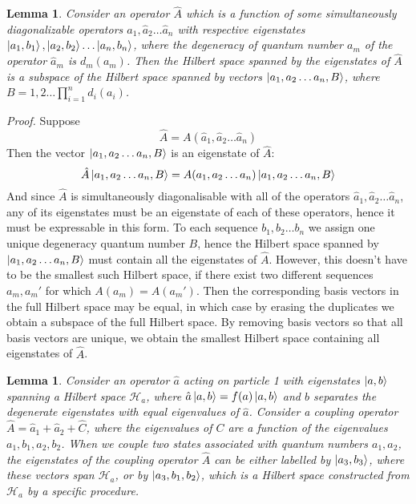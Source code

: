 \documentclass[12pt]{article}
\newtheorem{full_hilbert}
{Lemma}
\newtheorem{two_particle_coupling}
{Lemma}
\begin{document}
	\begin{full_hilbert}\label{Lemma:full_hilbert}
	Consider an operator $\hat{A}$ which is a function of some simultaneously diagonalizable operators $\hat{a}_1,\hat{a}_2\dots \hat{a}_n$ with respective eigenstates $\ket{a_1, b_1},\ket{a_2, b_2}\dots\ket{a_n, b_n}$, where the degeneracy of quantum number $a_m$ of the operator $\hat{a}_m$ is $d_m(a_m)$. Then the Hilbert space spanned by the eigenstates of $\hat{A}$ is a subspace of the Hilbert space spanned by vectors $\ket{a_1,a_2\dots a_n, B}$, where $B=1,2\dots \prod_{i=1}^n d_i(a_i)$.
	\end{full_hilbert}
	\textit{Proof.} Suppose
	$$\hat{A}=A(\hat{a}_1,\hat{a}_2\dots \hat{a}_n)$$
	Then the vector $\ket{a_1,a_2\dots a_n, B}$ is an eigenstate of $\hat{A}$:
	$$\hat{A}\ket{a_1,a_2\dots a_n, B}=A(a_1, a_2\dots a_n)\ket{a_1,a_2\dots a_n, B}$$
	And since $\hat{A}$ is simultaneously diagonalisable with all of the operators $\hat{a}_1,\hat{a}_2\dots\hat{a}_n$, any of its eigenstates must be an eigenstate of each of these operators, hence it must be expressable in this form. To each sequence $b_1,b_2\dots b_n$ we assign one unique degeneracy quantum number $B$, hence the Hilbert space spanned by $\ket{a_1,a_2\dots a_n, B}$ must contain all the eigenstates of $\hat{A}$. However, this doesn't have to be the smallest such Hilbert space, if there exist two different sequences $a_m, a_m'$ for which $A(a_m)=A(a_m')$. Then the corresponding basis vectors in the full Hilbert space may be equal, in which case by erasing the duplicates we obtain a subspace of the full Hilbert space. By removing basis vectors so that all basis vectors are unique, we obtain the smallest Hilbert space containing all eigenstates of $\hat{A}$.

	\begin{two_particle_coupling}
	Consider an operator $\hat{a}$ acting on particle 1 with eigenstates $\ket{a, b}$ spanning a Hilbert space $\mathcal{H}_a$, where $\hat{a}\ket{a,b}=f(a)\ket{a,b}$ and $b$ separates the degenerate eigenstates with equal eigenvalues of $\hat{a}$. Consider a coupling operator $\hat{A}=\hat{a}_1+\hat{a}_2+\hat{C}$, where the eigenvalues of $C$ are a function of the eigenvalues $a_1,b_1,a_2,b_2$. When we couple two states associated with quantum numbers $a_1,a_2$, the eigenstates of the coupling operator $\hat{A}$ can be either labelled by $\ket{a_3,b_3}$, where these vectors span $\mathcal{H}_a$, or by $\ket{a_3, b_1, b_2}$, which is a Hilbert space constructed from $\mathcal{H}_a$ by a specific procedure.
	\end{two_particle_coupling}
	
\end{document}
